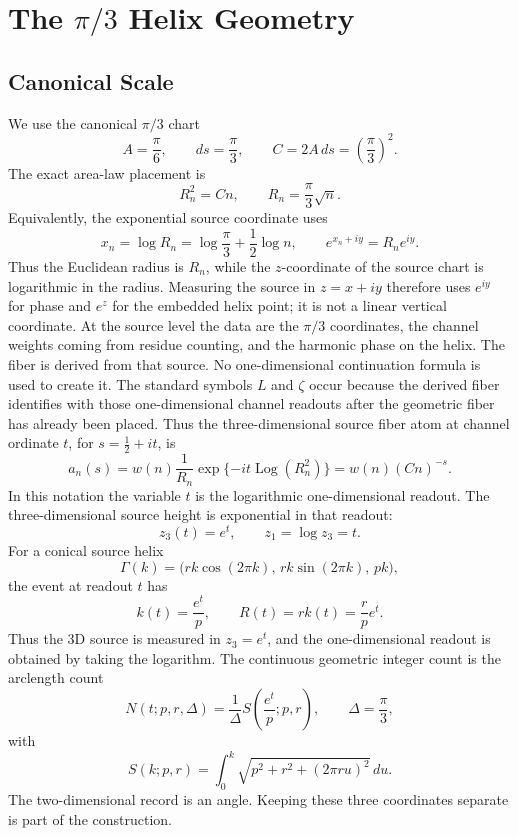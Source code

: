 \documentclass[11pt]{article}
\DeclareMathOperator{\Log}{Log}
\begin{document}
\section{\texorpdfstring{The $\pi/3$ Helix Geometry}{The pi/3 Helix Geometry}}

\subsection{Canonical Scale}

We use the canonical $\pi/3$ chart
\[
  A=\frac{\pi}{6},\qquad ds=\frac{\pi}{3},\qquad
  C=2A\,ds=\left(\frac{\pi}{3}\right)^2.
\]
The exact area-law placement is
\[
  R_n^2=Cn,\qquad R_n=\frac{\pi}{3}\sqrt n .
\]
Equivalently, the exponential source coordinate uses
\[
  x_n=\log R_n=\log\frac{\pi}{3}+\frac12\log n,\qquad
  e^{x_n+i y}=R_n e^{iy}.
\]
Thus the Euclidean radius is $R_n$, while the $z$-coordinate of the source
chart is logarithmic in the radius.  Measuring the source in $z=x+iy$ therefore
uses $e^{iy}$ for phase and $e^z$ for the embedded helix point; it is not a
linear vertical coordinate.
At the source level the data are the $\pi/3$ coordinates, the channel weights
coming from residue counting, and the harmonic phase on the helix.  The fiber is
derived from that source.  No one-dimensional continuation formula is used to
create it.  The standard symbols $L$ and $\zeta$ occur because the derived
fiber identifies with those one-dimensional channel readouts after the
geometric fiber has already been placed.
Thus the three-dimensional source fiber atom at channel ordinate $t$, for
$s=\frac12+it$, is
\[
  a_n(s)
  =
  w(n)\frac{1}{R_n}\exp\{-it\Log(R_n^2)\}
  =
  w(n)(Cn)^{-s}.
\]
In this notation the variable $t$ is the logarithmic one-dimensional readout.
The three-dimensional source height is exponential in that readout:
\[
  z_3(t)=e^t,\qquad z_1=\log z_3=t .
\]
For a conical source helix
\[
  \Gamma(k)=\bigl(rk\cos(2\pi k),\,rk\sin(2\pi k),\,pk\bigr),
\]
the event at readout $t$ has
\[
  k(t)=\frac{e^t}{p},\qquad
  R(t)=rk(t)=\frac rp e^t .
\]
Thus the 3D source is measured in $z_3=e^t$, and the one-dimensional readout is
obtained by taking the logarithm.  The continuous geometric integer count is
the arclength count
\[
  N(t;p,r,\Delta)
  =
  \frac{1}{\Delta}
  S\left(\frac{e^t}{p};p,r\right),
  \qquad \Delta=\frac{\pi}{3},
\]
with
\[
  S(k;p,r)=
  \int_0^k \sqrt{p^2+r^2+(2\pi r u)^2}\,du .
\]
The two-dimensional record is an angle.  Keeping these three coordinates
separate is part of the construction.
\end{document}
